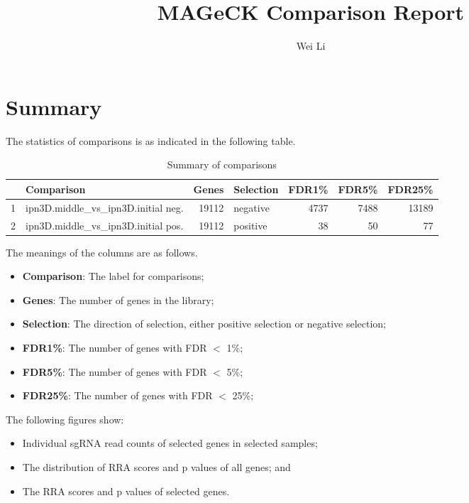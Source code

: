 \documentclass{article}
\begin{document}

\title{MAGeCK Comparison Report}
\author{Wei Li}

\maketitle


\tableofcontents

\section{Summary}


The statistics of comparisons is as indicated in the following table. 

\begin{table}[ht]
\centering
\begin{tabular}{rlrlrrr}
  \hline
 & Comparison & Genes & Selection & FDR1\% & FDR5\% & FDR25\% \\ 
  \hline
1 & ipn3D.middle\_vs\_ipn3D.initial neg. & 19112 & negative & 4737 & 7488 & 13189 \\ 
  2 & ipn3D.middle\_vs\_ipn3D.initial pos. & 19112 & positive & 38 & 50 & 77 \\ 
   \hline
\end{tabular}
\caption{Summary of comparisons} 
\label{tab:one}
\end{table}
The meanings of the columns are as follows.

\begin{itemize}
\item \textbf{Comparison}: The label for comparisons;
\item \textbf{Genes}: The number of genes in the library;
\item \textbf{Selection}: The direction of selection, either positive selection or negative selection;
\item \textbf{FDR1\%}: The number of genes with FDR $<$ 1\%;
\item \textbf{FDR5\%}: The number of genes with FDR $<$ 5\%;
\item \textbf{FDR25\%}: The number of genes with FDR $<$ 25\%;
\end{itemize}

The following figures show:

\begin{itemize}
\item Individual sgRNA read counts of selected genes in selected samples; 
\item The distribution of RRA scores and p values of all genes; and
\item The RRA scores and p values of selected genes.
\end{itemize}
\end{document}
